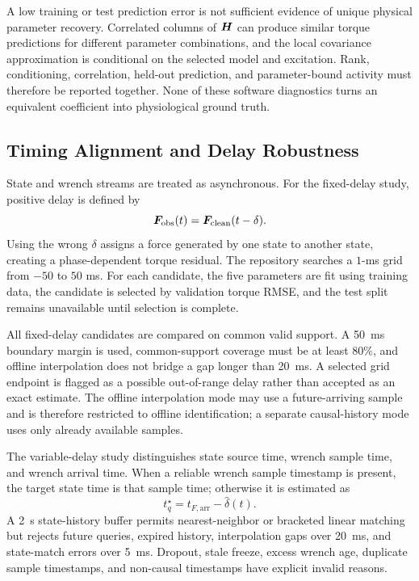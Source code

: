 A low training or test prediction error is not sufficient evidence of unique
physical parameter recovery.  Correlated columns of $\bm{H}$ can produce
similar torque predictions for different parameter combinations, and the
local covariance approximation is conditional on the selected model and
excitation.  Rank, conditioning, correlation, held-out prediction, and
parameter-bound activity must therefore be reported together.  None of these
software diagnostics turns an equivalent coefficient into physiological
ground truth.

\subsection{Timing Alignment and Delay Robustness}
\label{subsec:timing}

State and wrench streams are treated as asynchronous.  For the fixed-delay
study, positive delay is defined by
\begin{equation}
    \bm{F}_{\mathrm{obs}}(t)
    =\bm{F}_{\mathrm{clean}}(t-\delta).
    \label{eq:fixed_delay_definition}
\end{equation}
Using the wrong $\delta$ assigns a force generated by one state to another
state, creating a phase-dependent torque residual.  The repository searches a
$1$-ms grid from $-50$ to $50$ ms.  For each candidate, the five parameters are
fit using training data, the candidate is selected by validation torque RMSE,
and the test split remains unavailable until selection is complete.

All fixed-delay candidates are compared on common valid support.  A
\SI{50}{ms} boundary margin is used, common-support coverage must be at least
$80\%$, and offline interpolation does not bridge a gap longer than
\SI{20}{ms}.  A selected grid endpoint is flagged as a possible out-of-range
delay rather than accepted as an exact estimate.  The offline interpolation
mode may use a future-arriving sample and is therefore restricted to offline
identification; a separate causal-history mode uses only already available
samples.

The variable-delay study distinguishes state source time, wrench sample time,
and wrench arrival time.  When a reliable wrench sample timestamp is present,
the target state time is that sample time; otherwise it is estimated as
\begin{equation}
    t_{q}^{\star}=t_{F,\mathrm{arr}}-\hat\delta(t).
    \label{eq:variable_delay_target}
\end{equation}
A \SI{2}{s} state-history buffer permits nearest-neighbor or bracketed linear
matching but rejects future queries, expired history, interpolation gaps over
\SI{20}{ms}, and state-match errors over \SI{5}{ms}.  Dropout, stale freeze,
excess wrench age, duplicate sample timestamps, and non-causal timestamps have
explicit invalid reasons.

